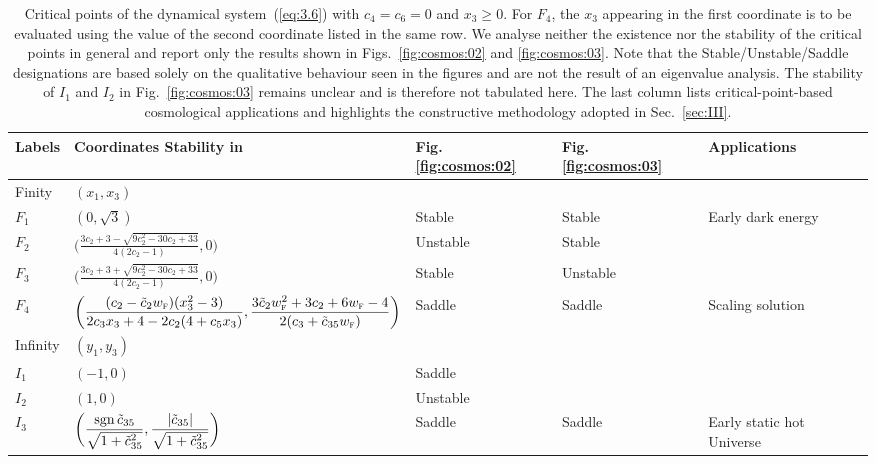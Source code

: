 \documentclass[aps,prd,twocolumn]{revtex4-2}
\newcommand\sgn{{\rm sgn}}
\newcommand\subF{\textsc{f}}
\begin{document}
\begin{table}[!t]
  \caption{Critical points of the dynamical system~(\ref{eq:3.6}) with $c_4=c_6=0$ and $x_3\geqslant0$. For $F_4$, the $x_3$ appearing in the first coordinate is to be evaluated using the value of the second coordinate listed in the same row. We analyse neither the existence nor the stability of the critical points in general and report only the results shown in Figs.~\ref{fig:cosmos:02} and \ref{fig:cosmos:03}. Note that the Stable/Unstable/Saddle designations are based solely on the qualitative behaviour seen in the figures and are not the result of an eigenvalue analysis. The stability of $I_1$ and $I_2$ in Fig.~\ref{fig:cosmos:03} remains unclear and is therefore not tabulated here. The last column lists critical-point-based cosmological applications and highlights the constructive methodology adopted in Sec.~\ref{sec:III}.}
  \label{tab:02}
  \begin{tabular*}{\hsize}{@{\ \ }@{\extracolsep{\fill}}lllll@{\ \ }}
    \hline\hline
    Labels         &  Coordinates \hfill Stability in  &  Fig. \ref{fig:cosmos:02}  &  Fig. \ref{fig:cosmos:03}  &  Applications  \\
    \hline
    Finity         &  $(x_1,x_3)$  \\
    $F_1$          &  $(0,\sqrt{3})$  &  Stable  &  Stable  &  Early dark energy  \\[0.3mm]
    $F_2$          &  $\bigg(\displaystyle\frac{3c_2+3-\sqrt{9c_2^2-30c_2+33}}{4(2c_2-1)}, 0\bigg)$  &  Unstable  &  Stable  &  \\[3mm]
    $F_3$          &  $\bigg(\displaystyle\frac{3c_2+3+\sqrt{9c_2^2-30c_2+33}}{4(2c_2-1)}, 0\bigg)$  &  Stable  &  Unstable  &  \\[3mm]
    $F_4$          &  $\bigg(\displaystyle\frac{(c_2-\tilde{c}_2w_\subF)(x_3^2-3)}{2c_3x_3+4-2c_2(4+c_5x_3)},
      \displaystyle\frac{3\tilde{c}_2w_\subF^2+3c_2+6w_\subF-4}{2(c_3+\tilde{c}_{35}w_\subF)}\bigg)$  &  Saddle  &  Saddle  &  Scaling solution  \\[3mm]
    \hline
    Infinity       &  $(y_1,y_3)$  \\
    $I_1$          &  $(-1,0)$  &  Saddle  &  \\
    $I_2$          &  $(1,0)$  &  Unstable  &  \\[1.5mm]
    $I_3$          &  $\bigg(\displaystyle\frac{\sgn\,\tilde{c}_{35}}{\sqrt{1+\tilde{c}_{35}^2}},\displaystyle\frac{|\tilde{c}_{35}|}{\sqrt{1+\tilde{c}_{35}^2}}\bigg)$  &  Saddle  &  Saddle  &  Early static hot Universe  \\[3mm]
    \hline\hline
  \end{tabular*}
\end{table}
\end{document}
